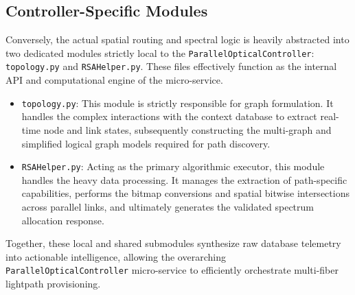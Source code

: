 \subsection*{\small Controller-Specific Modules}
Conversely, the actual spatial routing and spectral logic is heavily abstracted into two dedicated modules strictly local to the \texttt{ParallelOpticalController}: \texttt{topology.py} and \texttt{RSAHelper.py}. These files effectively function as the internal API and computational engine of the micro-service.
\begin{itemize}
    \item \texttt{topology.py}: This module is strictly responsible for graph formulation. It handles the complex interactions with the context database to extract real-time node and link states, subsequently constructing the multi-graph and simplified logical graph models required for path discovery.
    \item \texttt{RSAHelper.py}: Acting as the primary algorithmic executor, this module handles the heavy data processing. It manages the extraction of path-specific capabilities, performs the bitmap conversions and spatial bitwise intersections across parallel links, and ultimately generates the validated spectrum allocation response.
\end{itemize}
Together, these local and shared submodules synthesize raw database telemetry into actionable intelligence, allowing the overarching \texttt{ParallelOpticalController} micro-service to efficiently orchestrate multi-fiber lightpath provisioning.
